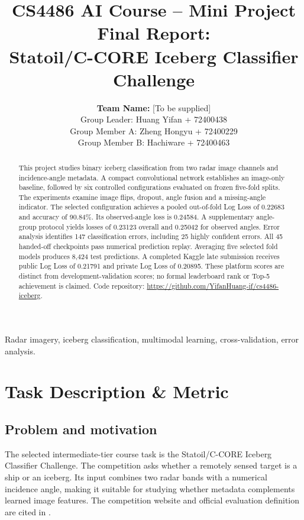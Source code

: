 \documentclass[journal]{IEEEtran}
\begin{document}
\title{CS4486 AI Course -- Mini Project Final Report:\\Statoil/C-CORE Iceberg Classifier Challenge}
\author{\textbf{Team Name:} [To be supplied]\\[1em]
Group Leader: Huang Yifan + 72400438\\
Group Member A: Zheng Hongyu + 72400229\\
Group Member B: Hachiware + 72400463}
\maketitle
\begin{abstract}
This project studies binary iceberg classification from two radar image channels and incidence-angle metadata. A compact convolutional network establishes an image-only baseline, followed by six controlled configurations evaluated on frozen five-fold splits. The experiments examine image flips, dropout, angle fusion and a missing-angle indicator. The selected configuration achieves a pooled out-of-fold Log Loss of 0.22683 and accuracy of 90.84\%. Its observed-angle loss is 0.24584. A supplementary angle-group protocol yields losses of 0.23123 overall and 0.25042 for observed angles. Error analysis identifies 147 classification errors, including 25 highly confident errors. All 45 handed-off checkpoints pass numerical prediction replay. Averaging five selected fold models produces 8,424 test predictions. A completed Kaggle late submission receives public Log Loss of 0.21791 and private Log Loss of 0.20895. These platform scores are distinct from development-validation scores; no formal leaderboard rank or Top-5 achievement is claimed. Code repository: \url{https://github.com/YifanHuang-if/cs4486-iceberg}.
\end{abstract}
\begin{IEEEkeywords}
Radar imagery, iceberg classification, multimodal learning, cross-validation, error analysis.
\end{IEEEkeywords}

\section{Task Description \& Metric}
\subsection{Problem and motivation}
The selected intermediate-tier course task is the Statoil/C-CORE Iceberg Classifier Challenge. The competition asks whether a remotely sensed target is a ship or an iceberg. Its input combines two radar bands with a numerical incidence angle, making it suitable for studying whether metadata complements learned image features. The competition website and official evaluation definition are cited in \cite{kaggle}.
\end{document}
